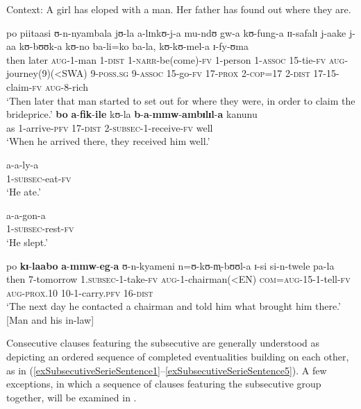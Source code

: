 \begin{exe}
\ex Context: A girl has eloped with a man. Her father has found out where they are.
\begin{xlist}
\ex \label{exSubsecutiveSerieSentence1} \gll po piitaasi ʊ-n-nyambala jʊ-la a-lɪnkʊ-j-a mu-ndʊ gw-a kʊ-fung-a ɪɪ-safalɪ j-aake j-aa kʊ-bʊʊk-a kʊ-no ba-li=ko ba-la, kʊ-kʊ-mel-a ɪ-fy-ʊma\\
then later \textsc{aug}-1-man 1-\textsc{dist} 1-\textsc{narr}-be(come)-\textsc{fv} 1-person 1-\textsc{assoc} 15-tie-\textsc{fv} \textsc{aug}-journey(9)(<SWA) 9-\textsc{poss.sg} 9-\textsc{assoc} 15-go-\textsc{fv} 17-\textsc{prox} 2-\textsc{cop}=17 2-\textsc{dist} 17-15-claim-\textsc{fv} \textsc{aug}-8-rich\\
\glt \lq Then later that man started to set out for where they were, in order to claim the brideprice.'
\ex \label{exSubsecutiveSerieSentence2}\gll \textbf{bo} \textbf{a}-\textbf{fik}-\textbf{ile} kʊ-la \textbf{b}-\textbf{a}-\textbf{mmw}-\textbf{ambɪlɪl}-\textbf{a} kanunu\\
as 1-arrive-\textsc{pfv} 17-\textsc{dist} 2-\textsc{subsec}-1-receive-\textsc{fv} well\\
\glt \lq When he arrived there, they received him well.'

\ex \gll a-a-ly-a\\
1-\textsc{subsec}-eat-\textsc{fv}\\
\glt \lq He ate.'

\ex \gll a-a-gon-a\\
1-\textsc{subsec}-rest-\textsc{fv}\\
\glt \lq He slept.'

\ex \label{exSubsecutiveSerieSentence5} \gll po \textbf{kɪ}-\textbf{laabo} \textbf{a}-\textbf{mmw}-\textbf{eg}-\textbf{a} ʊ-n-kyameni n=ʊ-kʊ-m̩-bʊʊl-a ɪ-si si-n-twele pa-la\\
then 7-tomorrow 1.\textsc{subsec}-1-take-\textsc{fv} \textsc{aug}-1-chairman(<EN) \textsc{com}=\textsc{aug}-15-1-tell-\textsc{fv} \textsc{aug}-\textsc{prox.10} 10-1-carry.\textsc{pfv} 16-\textsc{dist}\\
\glt \lq The next day he contacted  a chairman and told him what brought him there.' [Man and his in-law]

\end{xlist}
\end{exe}

Consecutive clauses featuring the subsecutive are generally understood as depicting an ordered sequence of completed eventualities building on each other, as in (\ref{exSubsecutiveSerieSentence1}--\ref{exSubsecutiveSerieSentence5}). A few exceptions, in which a sequence of clauses featuring the subsecutive group together, will be examined in .

